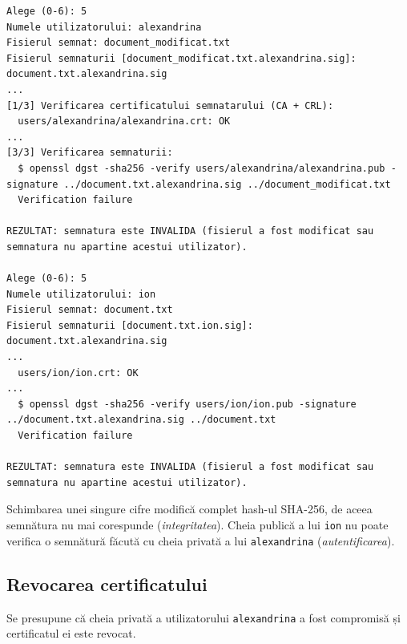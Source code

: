 \documentclass[12pt,a4paper]{article}
\begin{document}
\begin{lstlisting}[style=terminal, caption={Semnătura nu corespunde fișierului modificat sau altui utilizator}]
Alege (0-6): 5
Numele utilizatorului: alexandrina
Fisierul semnat: document_modificat.txt
Fisierul semnaturii [document_modificat.txt.alexandrina.sig]: document.txt.alexandrina.sig
...
[1/3] Verificarea certificatului semnatarului (CA + CRL):
  users/alexandrina/alexandrina.crt: OK
...
[3/3] Verificarea semnaturii:
  $ openssl dgst -sha256 -verify users/alexandrina/alexandrina.pub -signature ../document.txt.alexandrina.sig ../document_modificat.txt
  Verification failure

REZULTAT: semnatura este INVALIDA (fisierul a fost modificat sau semnatura nu apartine acestui utilizator).

Alege (0-6): 5
Numele utilizatorului: ion
Fisierul semnat: document.txt
Fisierul semnaturii [document.txt.ion.sig]: document.txt.alexandrina.sig
...
  users/ion/ion.crt: OK
...
  $ openssl dgst -sha256 -verify users/ion/ion.pub -signature ../document.txt.alexandrina.sig ../document.txt
  Verification failure

REZULTAT: semnatura este INVALIDA (fisierul a fost modificat sau semnatura nu apartine acestui utilizator).
\end{lstlisting}

Schimbarea unei singure cifre modifică complet hash-ul SHA-256, de aceea
semnătura nu mai corespunde (\emph{integritatea}). Cheia publică a lui
\texttt{ion} nu poate verifica o semnătură făcută cu cheia privată a lui
\texttt{alexandrina} (\emph{autentificarea}).

\subsection{Revocarea certificatului}

Se presupune că cheia privată a utilizatorului \texttt{alexandrina} a fost
compromisă și certificatul ei este revocat.
\end{document}
